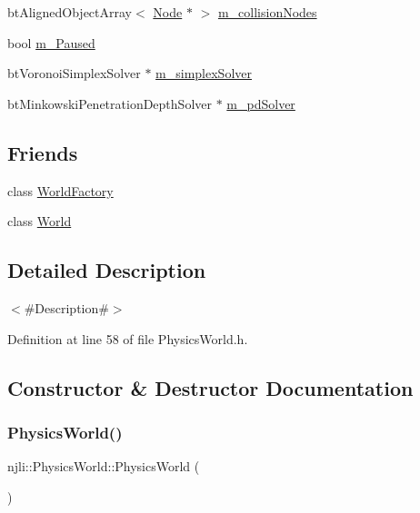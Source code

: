 \begin{DoxyCompactItemize}
\item 
bt\+Aligned\+Object\+Array$<$ \mbox{\hyperlink{classnjli_1_1_node}{Node}} $\ast$ $>$ \mbox{\hyperlink{classnjli_1_1_physics_world_a8f68c492c26e09fa5dcc538c5c63b587}{m\+\_\+collision\+Nodes}}
\item 
bool \mbox{\hyperlink{classnjli_1_1_physics_world_a1dd5d5abfae452cdacad0836b9713940}{m\+\_\+\+Paused}}
\item 
bt\+Voronoi\+Simplex\+Solver $\ast$ \mbox{\hyperlink{classnjli_1_1_physics_world_ac17465bcb753aec34bb4ddf5faf34a03}{m\+\_\+simplex\+Solver}}
\item 
bt\+Minkowski\+Penetration\+Depth\+Solver $\ast$ \mbox{\hyperlink{classnjli_1_1_physics_world_a4eb1b6e28edaf8ce45facce58be6cf7b}{m\+\_\+pd\+Solver}}
\end{DoxyCompactItemize}
\subsection*{Friends}
\begin{DoxyCompactItemize}
\item 
class \mbox{\hyperlink{classnjli_1_1_physics_world_acb96ebb09abe8f2a37a915a842babfac}{World\+Factory}}
\item 
class \mbox{\hyperlink{classnjli_1_1_physics_world_a7b4bcdf992c21ae83363f25df05b1d25}{World}}
\end{DoxyCompactItemize}


\subsection{Detailed Description}
$<$\#\+Description\#$>$ 

Definition at line 58 of file Physics\+World.\+h.



\subsection{Constructor \& Destructor Documentation}
\mbox{\label{classnjli_1_1_physics_world_a64f4e12a96831a18cf568fb338193379}} 
\subsubsection{\texorpdfstring{Physics\+World()}{PhysicsWorld()}\hspace{0.1cm}{\footnotesize\ttfamily [1/3]}}
{\footnotesize\ttfamily njli\+::\+Physics\+World\+::\+Physics\+World (\begin{DoxyParamCaption}{ }\end{DoxyParamCaption})\hspace{0.3cm}{\ttfamily [protected]}}

